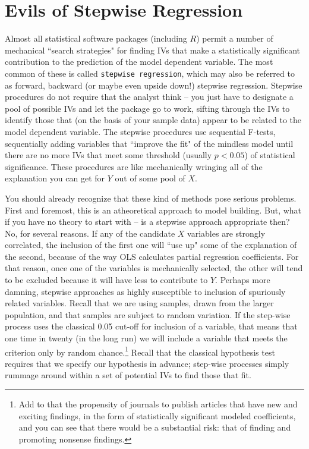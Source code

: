 \documentclass[11pt,openany]{book}\usepackage[]{graphicx}\usepackage[]{color}
\begin{document}
\section{Evils of Stepwise Regression}

Almost all statistical software packages (including $R$) permit a number of mechanical ``search strategies" for finding IVs that make a statistically significant contribution to the prediction of the model dependent variable. The most common of these is called \texttt{stepwise regression}, which may also be referred to as forward, backward (or maybe even upside down!) stepwise regression. Stepwise procedures do not require that the analyst think -- you just have to designate a pool of possible IVs and let the package go to work, sifting through the IVs to identify those that (on the
basis of your sample data) appear to be related to the model dependent variable.  The stepwise procedures use sequential F-tests, sequentially adding variables that ``improve the fit" of the mindless model until there are no more IVs that meet some threshold (usually $p<0.05$) of statistical significance. These procedures are like mechanically wringing all of the explanation you can get for $Y$ out of some pool of $X$.

You should already recognize that these kind of methods pose serious problems. First and foremost, this is an atheoretical approach to model building. But, what if you have no theory to start with -- is a stepwise approach appropriate then? No, for several reasons. If any of the candidate $X$ variables are strongly correlated, the inclusion of the first one will ``use up" some of the explanation of the second, because of the way OLS calculates partial regression coefficients. For that reason, once one of the variables is mechanically selected, the other will tend to be excluded because it will have less to contribute to $Y$. Perhaps more damning, stepwise approaches as highly susceptible to inclusion of spuriously related variables. Recall that we are using samples, drawn from the larger population, and that samples are subject to random variation. If the step-wise process uses the classical 0.05 cut-off for inclusion of a variable, that means that one time in twenty (in the long run) we will include a variable that meets the criterion only by random chance.\footnote{Add to that the propensity of journals to publish articles that have new and exciting findings, in the form of statistically significant modeled coefficients, and you can see that there would be a substantial risk: that of finding and promoting nonsense findings.} Recall that the classical hypothesis test requires that we specify our hypothesis in advance; step-wise processes simply rummage around within a set of potential IVs to find those that fit.
\end{document}
